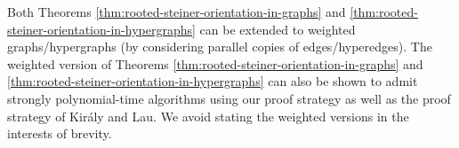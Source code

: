 \documentclass{article}
\newcommand{\knote}[1]{{\color{red}[{\tiny Karthik: \bf #1}]\marginpar{\color{red}*}}}
\begin{document}
Both Theorems \ref{thm:rooted-steiner-orientation-in-graphs} and \ref{thm:rooted-steiner-orientation-in-hypergraphs} can be extended to weighted graphs/hypergraphs (by considering parallel copies of edges/hyperedges). The weighted version of Theorems \ref{thm:rooted-steiner-orientation-in-graphs} and \ref{thm:rooted-steiner-orientation-in-hypergraphs} can also be shown to admit strongly polynomial-time algorithms using our proof strategy as well as the proof strategy of Kir\'{a}ly and Lau. We avoid stating the weighted versions in the interests of brevity. 



\end{document}

